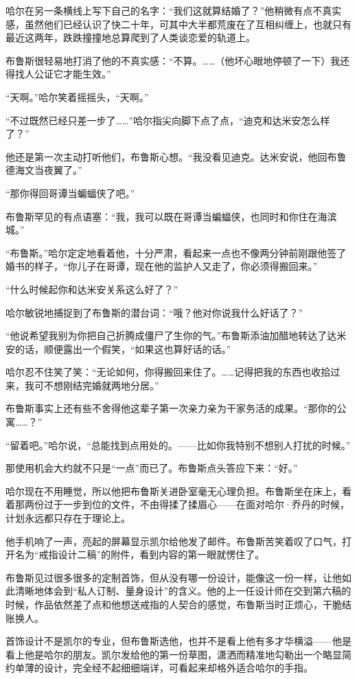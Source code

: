 \documentclass[../main]{subfiles}
\begin{document}
哈尔在另一条横线上写下自己的名字：“我们这就算结婚了？”他稍微有点不真实感，虽然他们已经认识了快二十年，可其中大半都荒废在了互相纠缠上，也就只有最近这两年，跌跌撞撞地总算爬到了人类谈恋爱的轨道上。

布鲁斯很轻易地打消了他的不真实感：“不算。\ldots\ldots（他坏心眼地停顿了一下）我还得找人公证它才能生效。”

“天啊。”哈尔笑着摇摇头，“天啊。”

“不过既然已经只差一步了\ldots\ldots”哈尔指尖向脚下点了点，“迪克和达米安怎么样了？”

他还是第一次主动打听他们，布鲁斯心想。“我没看见迪克。达米安说，他回布鲁德海文当夜翼了。”

“那你得回哥谭当蝙蝠侠了吧。”

布鲁斯罕见的有点语塞：“我，我可以既在哥谭当蝙蝠侠，也同时和你住在海滨城。”

“布鲁斯。”哈尔定定地看着他，十分严肃，看起来一点也不像两分钟前刚跟他签了婚书的样子，“你儿子在哥谭，现在他的监护人又走了，你必须得搬回来。”

“什么时候起你和达米安关系这么好了？”

哈尔敏锐地捕捉到了布鲁斯的潜台词：“哦？他对你说我什么好话了？”

“他说希望我别为你把自己折腾成僵尸了生你的气。”布鲁斯添油加醋地转达了达米安的话，顺便露出一个假笑，“如果这也算好话的话。”

哈尔忍不住笑了笑：“无论如何，你得搬回来住了。……记得把我的东西也收拾过来，我可不想刚结完婚就两地分居。”

布鲁斯事实上还有些不舍得他这辈子第一次亲力亲为干家务活的成果。“那你的公寓\ldots\ldots？”

“留着吧。”哈尔说，“总能找到点用处的。——比如你我特别不想别人打扰的时候。”

那使用机会大约就不只是“一点”而已了。布鲁斯点头答应下来：“好。”

哈尔现在不用睡觉，所以他把布鲁斯关进卧室毫无心理负担。布鲁斯坐在床上，看着那两份过于一步到位的文件，不由得揉了揉眉心——在面对哈尔·乔丹的时候，计划永远都只存在于理论上。

他手机响了一声，亮起的屏幕显示凯尔给他发了邮件。布鲁斯苦笑着叹了口气，打开名为“戒指设计二稿”的附件，看到内容的第一眼就愣住了。

布鲁斯见过很多很多的定制首饰，但从没有哪一份设计，能像这一份一样，让他如此清晰地体会到“私人订制、量身设计”的含义。他的上一任设计师在交到第六稿的时候，作品依然差了点和他想送戒指的人契合的感觉，布鲁斯当时正烦心，干脆结账换人。

首饰设计不是凯尔的专业，但布鲁斯选他，也并不是看上他有多才华横溢——他是看上他是哈尔的朋友。凯尔发给他的第一份草图，潇洒而精准地勾勒出一个略显简约单薄的设计，完全经不起细细端详，可看起来却格外适合哈尔的手指。
\end{document}
